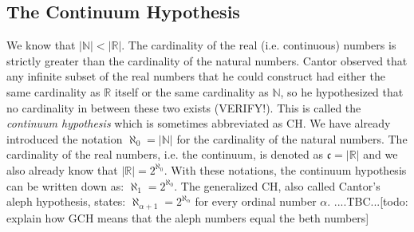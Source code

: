 






\subsection{The Continuum Hypothesis}
We know that $|\mathbb{N}| < |\mathbb{R}|$. The cardinality of the real (i.e. continuous) numbers is strictly greater than the cardinality of the natural numbers. Cantor observed that any infinite subset of the real numbers that he could construct had either the same cardinality as $\mathbb{R}$ itself or the same cardinality as $\mathbb{N}$, so he hypothesized that no cardinality in between these two exists (VERIFY!). This is called the \emph{continuum hypothesis} which is sometimes abbreviated as CH. We have already introduced the notation $\aleph_0 = |\mathbb{N}|$ for the cardinality of the natural numbers. The cardinality of the real numbers, i.e. the continuum, is denoted as $\mathfrak{c} = |\mathbb{R}|$ and we also already know that $|\mathbb{R}| = 2^{\aleph_0}$. With these notations, the continuum hypothesis can be written down as: $\aleph_1 = 2^{\aleph_0}$. The generalized CH, also called Cantor's aleph hypothesis, states: $\aleph_{\alpha+1} = 2^{\aleph_{\alpha}}$ for every ordinal number $\alpha$. ....TBC...[todo: explain how GCH means that the aleph numbers equal the beth numbers]




